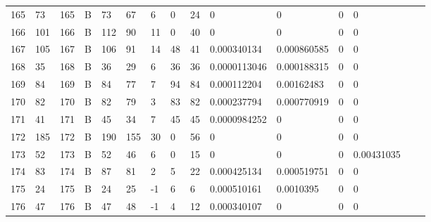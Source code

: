 \begin{longtable}{lllllllllllllll}
	165 & 73                & 165 & B   & 73                & 67                & 6                 & 0    & 24         & 0              & 0              & 0             & 0            \\
	166 & 101               & 166 & B   & 112               & 90                & 11                & 0    & 40         & 0              & 0              & 0             & 0            \\
	167 & 105               & 167 & B   & 106               & 91                & 14                & 48   & 41         & 0.000340134    & 0.000860585    & 0             & 0            \\
	168 & 35                & 168 & B   & 36                & 29                & 6                 & 36   & 36         & 0.0000113046   & 0.000188315    & 0             & 0            \\
	169 & 84                & 169 & B   & 84                & 77                & 7                 & 94   & 84         & 0.000112204    & 0.00162483     & 0             & 0            \\
	170 & 82                & 170 & B   & 82                & 79                & 3                 & 83   & 82         & 0.000237794    & 0.000770919    & 0             & 0            \\
	171 & 41                & 171 & B   & 45                & 34                & 7                 & 45   & 45         & 0.0000984252   & 0              & 0             & 0            \\
	172 & 185               & 172 & B   & 190               & 155               & 30                & 0    & 56         & 0              & 0              & 0             & 0            \\
	173 & 52                & 173 & B   & 52                & 46                & 6                 & 0    & 15         & 0              & 0              & 0             & 0.00431035   \\
	174 & 83                & 174 & B   & 87                & 81                & 2                 & 5    & 22         & 0.000425134    & 0.000519751    & 0             & 0            \\
	175 & 24                & 175 & B   & 24                & 25                & -1                & 6    & 6          & 0.000510161    & 0.0010395      & 0             & 0            \\
	176 & 47                & 176 & B   & 47                & 48                & -1                & 4    & 12         & 0.000340107    & 0              & 0             & 0            \\

\end{longtable}

